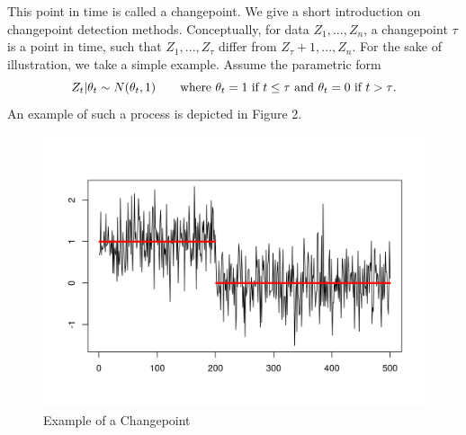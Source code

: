 \documentclass[11pt]{article}
\begin{document}
This point in time is called a changepoint. We give a short introduction on changepoint detection methods.\clearpage
{} Conceptually, for data $Z_1,...,Z_n$, a changepoint $\tau$ is a point in time, such that $Z_1,...,Z_\tau$ differ from  $Z_\tau+1,...,Z_n$. For the sake of illustration, we take a simple example. Assume the parametric form
\begin{equation*}
	Z_t|\theta_t\sim N(\theta_t,1) \tag*{where $\theta_t=1 ~\text{if}~ t\leq\tau$ and $\theta_t=0 ~\text{if}~ t>\tau$}.
\end{equation*} An example of such a process is depicted in Figure 2.
\begin{figure}[h]
	\centering
	\includegraphics[width=0.75\linewidth]{../img/changepointex.png}
	\caption{Example of a Changepoint}
\end{figure}
\end{document}
